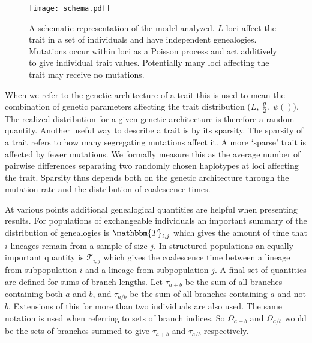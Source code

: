 \begin{figure}
  \centering
  \texttt{[image: schema.pdf]}
  \caption{A schematic representation of the model analyzed.
  $L$ loci affect the trait in a set of individuals and have independent
  genealogies. Mutations occur within loci as a Poisson process and act
  additively to give individual trait values. Potentially many loci affecting
  the trait may receive no mutations.}
  \label{fig:schema}
\end{figure}

When we refer to the genetic architecture of a trait this is used to mean the
combination of genetic parameters affecting the trait distribution ($L$, $\frac{\theta}{2}$,
$\psi()$). The realized distribution for a given genetic architecture is
therefore a random quantity. Another useful way to describe a trait is by its
sparsity. The sparsity of a trait refers to how many segregating mutations
affect it. A more `sparse' trait is affected by fewer mutations. We formally
measure this as the average number of pairwise differences separating two
randomly chosen haplotypes at loci affecting the trait. Sparsity thus depends
both on the genetic architecture through the mutation rate and the distribution
of coalescence times.

At various points additional genealogical quantities are helpful when presenting
results. For populations of exchangeable individuals an important summary of the
distribution of genealogies is $\mathbbm{T}_{i,j}$ which gives the amount of
time that $i$ lineages remain from a sample of size $j$. In structured
populations an equally important quantity is $\mathcal{T}_{i,j}$ which gives the
coalescence time between a lineage from subpopulation $i$ and a lineage from
subpopulation $j$. A final set of quantities are defined for sums of branch
lengths. Let $\tau_{a+b}$ be the sum of all branches containing both $a$ and
$b$, and $\tau_{a/b}$ be the sum of all branches containing $a$ and not $b$.
Extensions of this for more than two individuals are also used. The same
notation is used when referring to sets of branch indices. So $\Omega_{a+b}$ and
$\Omega_{a/b}$ would be the sets of branches summed to give $\tau_{a+b}$ and
$\tau_{a/b}$ respectively.




